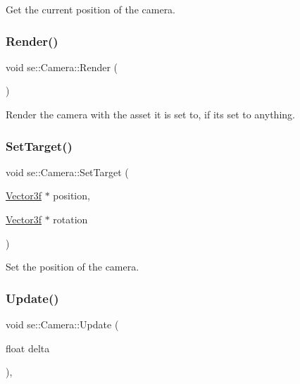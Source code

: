 Get the current position of the camera. \mbox{\label{classse_1_1_camera_a8331699adb431843563dfdab355e54f0}} 
\subsubsection{\texorpdfstring{Render()}{Render()}}
{\footnotesize\ttfamily void se\+::\+Camera\+::\+Render (\begin{DoxyParamCaption}{ }\end{DoxyParamCaption})}

Render the camera with the asset it is set to, if it\textquotesingle{}s set to anything. \mbox{\label{classse_1_1_camera_ac49219007d931e1800a33d2603f08856}} 
\subsubsection{\texorpdfstring{Set\+Target()}{SetTarget()}}
{\footnotesize\ttfamily void se\+::\+Camera\+::\+Set\+Target (\begin{DoxyParamCaption}\item[{\mbox{\hyperlink{namespacese_a12e07512d95e2fdebdaf74a5ea2cf5f6}{Vector3f}} $\ast$}]{position,  }\item[{\mbox{\hyperlink{namespacese_a12e07512d95e2fdebdaf74a5ea2cf5f6}{Vector3f}} $\ast$}]{rotation }\end{DoxyParamCaption})}

Set the position of the camera. \mbox{\label{classse_1_1_camera_abecf2d50dc793707a475b35bb487812c}} 
\subsubsection{\texorpdfstring{Update()}{Update()}}
{\footnotesize\ttfamily void se\+::\+Camera\+::\+Update (\begin{DoxyParamCaption}\item[{float}]{delta }\end{DoxyParamCaption})\hspace{0.3cm}{\ttfamily [override]}, {\ttfamily [virtual]}}

